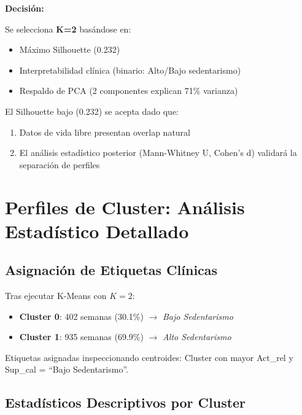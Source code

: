 \documentclass[12pt,letterpaper,twoside]{report}
\begin{document}
\begin{decisionbox}
\textbf{Decisión:}

Se selecciona \textbf{K=2} basándose en:
\begin{itemize}[noitemsep]
    \item Máximo Silhouette (0.232)
    \item Interpretabilidad clínica (binario: Alto/Bajo sedentarismo)
    \item Respaldo de PCA (2 componentes explican 71\% varianza)
\end{itemize}

El Silhouette bajo (0.232) se acepta dado que:
\begin{enumerate}[noitemsep]
    \item Datos de vida libre presentan overlap natural
    \item El análisis estadístico posterior (Mann-Whitney U, Cohen's d) validará la separación de perfiles
\end{enumerate}
\end{decisionbox}

\section{Perfiles de Cluster: Análisis Estadístico Detallado}

\subsection{Asignación de Etiquetas Clínicas}

Tras ejecutar K-Means con $K=2$:
\begin{itemize}[noitemsep]
    \item \textbf{Cluster 0}: 402 semanas (30.1\%) $\to$ \textit{Bajo Sedentarismo}
    \item \textbf{Cluster 1}: 935 semanas (69.9\%) $\to$ \textit{Alto Sedentarismo}
\end{itemize}

Etiquetas asignadas inspeccionando centroides: Cluster con mayor Act\_rel y Sup\_cal = ``Bajo Sedentarismo''.

\subsection{Estadísticos Descriptivos por Cluster}
\end{document}
